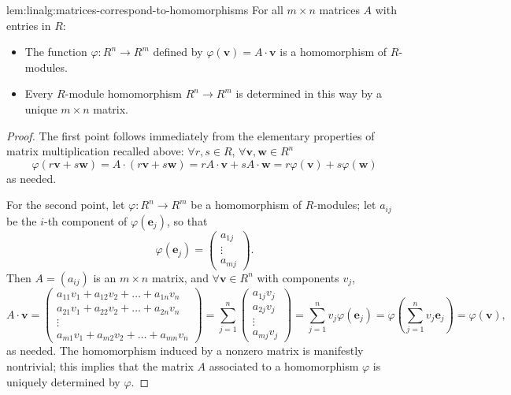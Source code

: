 \begin{lem}{}{lem:linalg:matrices-correspond-to-homomorphisms}
  For all $m \times n$ matrices $A$ with entries in $R$:
  \begin{itemize}
  \item The function $\varphi : R^n \to R^m$ defined by
    $\varphi(\mathbf{v}) = A \cdot \mathbf{v}$ is a homomorphism of
    $R$-modules.
  \item Every $R$-module homomorphism $R^n \to R^m$ is determined in
    this way by a unique $m \times n$ matrix.
  \end{itemize}
\end{lem}
\begin{proof}
  The first point follows immediately from the elementary properties
  of matrix multiplication recalled above: $\forall r, s \in R$,
  $\forall \mathbf{v}, \mathbf{w} \in R^n$
  \[
    \varphi(r\mathbf{v} + s\mathbf{w}) = A \cdot (r\mathbf{v} +
    s\mathbf{w}) = rA \cdot \mathbf{v} + sA \cdot \mathbf{w} =
    r\varphi(\mathbf{v}) + s\varphi(\mathbf{w})
  \]
  as needed.

  For the second point, let $\varphi : R^n \to R^m$ be a homomorphism
  of $R$-modules; let $a_{ij}$ be the $i$-th component of
  $\varphi(\mathbf{e}_j)$, so that
  \[
    \varphi(\mathbf{e}_j) = \begin{pmatrix} a_{1j} \\ \vdots \\ a_{mj}
    \end{pmatrix}.
  \]
  Then $A = (a_{ij})$ is an $m \times n$ matrix, and
  $\forall \mathbf{v} \in R^n$ with components $v_j$,
  \[
    A \cdot \mathbf{v} =
    \begin{pmatrix}
      a_{11}v_1 + a_{12}v_2 + \dots + a_{1n}v_n \\
      a_{21}v_1 + a_{22}v_2 + \dots + a_{2n}v_n \\
      \vdots \\
      a_{m1}v_1 + a_{m2}v_2 + \dots + a_{mn}v_n
    \end{pmatrix}
    = \sum_{j=1}^n \begin{pmatrix} a_{1j}v_j \\ a_{2j}v_j \\ \vdots \\
      a_{mj}v_j \end{pmatrix} = \sum_{j=1}^n v_j \varphi(\mathbf{e}_j)
  = \varphi\left( \sum_{j=1}^n v_j \mathbf{e}_j \right) =
  \varphi(\mathbf{v}),
\]
as needed. The homomorphism induced by a nonzero matrix is manifestly
nontrivial; this implies that the matrix $A$ associated to a
homomorphism $\varphi$ is uniquely determined by $\varphi$.
\end{proof}

